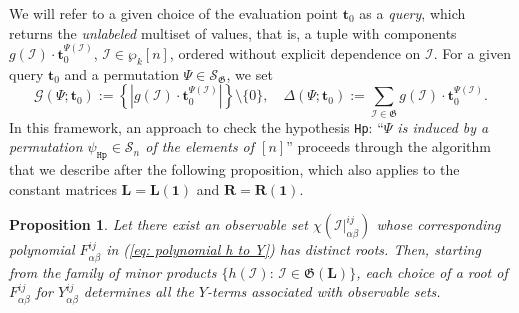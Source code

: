 \documentclass[10pt]{article}
\newtheorem{prop}{Proposition}%
\theoremstyle{remark}%
\theoremstyle{definition}%
\begin{document}
We will refer to a given choice of the evaluation point $\mathbf{t}_{0}$ as a \emph{query}, which returns the \emph{unlabeled} multiset of values, that is, a tuple with components $g(\mathcal{I})\cdot\mathbf{t}_{0}^{\Psi(\mathcal{I})}$, $\mathcal{I}\in\wp_{k}[n]$, ordered without explicit dependence on $\mathcal{I}$. For a given query $\mathbf{t}_{0}$ and a permutation $\Psi\in\mathcal{S}_{\mathfrak{G}}$, we set 
 \begin{equation}
\mathcal{G}(\Psi;\mathbf{t}_{0}):=\left\{ \left| g(\mathcal{I})\cdot\mathbf{t}_{0}^{\Psi(\mathcal{I})}\right|\right\} \setminus\{0\},
\quad
\Delta(\Psi;\mathbf{t}_{0}):=\sum_{\mathcal{I}\in\mathfrak{G}}g(\mathcal{I})\cdot\mathbf{t}_{0}^{\Psi(\mathcal{I})}.
\label{eq: CB terms and quasi-determinantal coupling permutation}
 \end{equation}
In this framework, an approach to check the hypothesis \texttt{Hp}: ``\textit{$\Psi$ is induced by a permutation $\psi_{\mathtt{Hp}}\in\mathcal{S}_{n}$ of the elements of $[n]$}'' proceeds through the algorithm that we describe after the following proposition, which also applies to the constant matrices $\mathbf{L}=\mathbf{L}(\mathbf{1})$ and $\mathbf{R}=\mathbf{R}(\mathbf{1})$. 
\begin{prop}
\label{prop: sign ambiguity removal}
Let there exist an observable set $\chi(\mathcal{I}|_{\alpha\beta}^{ij})$ whose corresponding polynomial $F_{\alpha\beta}^{ij}$ in (\ref{eq: polynomial h to Y}) has distinct roots. Then, starting from the family of minor products $\{ h(\mathcal{I}):\,\mathcal{I}\in\mathfrak{G}(\mathbf{L}) \}$, each choice of a root of $F_{\alpha\beta}^{ij}$ for $Y_{\alpha\beta}^{ij}$ determines all the $Y$-terms associated with observable sets.
\end{prop}
\end{document}
